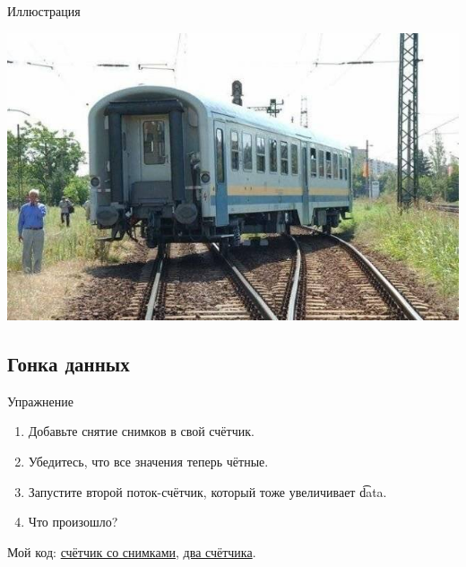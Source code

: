 \begin{frame}{Иллюстрация}
	\begin{center}
		\includegraphics[scale=0.6]{race-condition.jpg}
	\end{center}
\end{frame}

\subsection{Гонка данных}
\begin{frame}{Упражнение}
	\begin{enumerate}
		\item Добавьте снятие снимков в свой счётчик.
		\item Убедитесь, что все значения теперь чётные.
		\item Запустите второй поток-счётчик, который тоже увеличивает \t{data}.
		\item Что произошло?
	\end{enumerate}
	Мой код:
	\href{https://github.com/yeputons/fall-2017-paradigms/raw/master/171023/sources/07-even-counter-snapshot.cpp}{счётчик со снимками},
	\href{https://github.com/yeputons/fall-2017-paradigms/raw/master/171023/sources/08-two-threads.cpp}{два счётчика}.
\end{frame}

